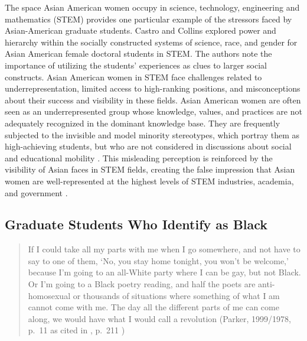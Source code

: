 \documentclass[
  11pt,
]{book}
\begin{document}
The space Asian American women occupy in science, technology, engineering and mathematics (STEM) provides one particular example of the stressors faced by Asian-American graduate students. Castro and Collins \citeyearpar{castro_asian_2021} explored power and hierarchy within the socially constructed systems of science, race, and gender for Asian American female doctoral students in STEM. The authors note the importance of utilizing the students' experiences as clues to larger social constructs. Asian American women in STEM face challenges related to underrepresentation, limited access to high-ranking positions, and misconceptions about their success and visibility in these fields. Asian American women are often seen as an underrepresented group whose knowledge, values, and practices are not adequately recognized in the dominant knowledge base. They are frequently subjected to the invisible and model minority stereotypes, which portray them as high-achieving students, but who are not considered in discussions about social and educational mobility \citep{castro_asian_2021}. This misleading perception is reinforced by the visibility of Asian faces in STEM fields, creating the false impression that Asian women are well-represented at the highest levels of STEM industries, academia, and government \citep{castro_asian_2021}.

\subsection{Graduate Students Who Identify as Black}\label{graduate-students-who-identify-as-black}

\begin{quote}
If I could take all my parts with me when I go somewhere, and not have to say to one of them, `No, you stay home tonight, you won't be welcome,' because I'm going to an all-White party where I can be gay, but not Black. Or I'm going to a Black poetry reading, and half the poets are anti-homosexual or thousands of situations where something of what I am cannot come with me. The day all the different parts of me can come along, we would have what I would call a revolution (Parker, 1999/1978, p.~11 as cited in \citet{minnett_help_2019}, p.~211 )
\end{quote}
\end{document}
